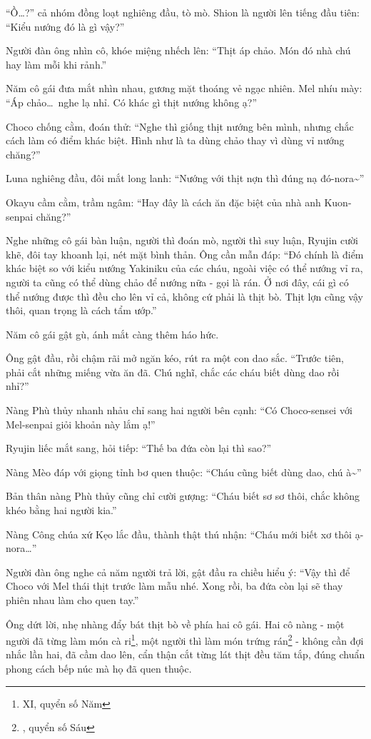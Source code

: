 \documentclass[../main.tex]{subfiles}
\begin{document}
``Ồ\dots?'' cả nhóm đồng loạt nghiêng đầu, tò mò. Shion là người lên tiếng đầu tiên: ``Kiểu nướng đó là gì vậy?''

Người đàn ông nhìn cô, khóe miệng nhếch lên: ``Thịt áp chảo. Món đó nhà chú hay làm mỗi khi rảnh.''

Năm cô gái đưa mắt nhìn nhau, gương mặt thoáng vẻ ngạc nhiên. Mel nhíu mày: ``Áp chảo\dots\ nghe lạ nhỉ. Có khác gì thịt nướng không ạ?''

Choco chống cằm, đoán thử: ``Nghe thì giống thịt nướng bên mình, nhưng chắc cách làm có điểm khác biệt. Hình như là ta dùng chảo thay vì dùng vỉ nướng chăng?''

Luna nghiêng đầu, đôi mắt long lanh: ``Nướng với thịt nợn thì đúng nạ đó-nora\~{}''

Okayu cầm cằm, trầm ngâm: ``Hay đây là cách ăn đặc biệt của nhà anh Kuon-senpai chăng?''

Nghe những cô gái bàn luận, người thì đoán mò, người thì suy luận, Ryujin cười khẽ, đôi tay khoanh lại, nét mặt bình thản. Ông cần mẫn đáp: ``Đó chính là điểm khác biệt so với kiểu nướng Yakiniku của các cháu, ngoài việc có thể nướng vỉ ra, người ta cũng có thể dùng chảo để nướng nữa - gọi là rán. Ở nơi đây, cái gì có thể nướng được thì đều cho lên vỉ cả, không cứ phải là thịt bò. Thịt lợn cũng vậy thôi, quan trọng là cách tẩm ướp.''

Năm cô gái gật gù, ánh mắt càng thêm háo hức.

Ông gật đầu, rồi chậm rãi mở ngăn kéo, rút ra một con dao sắc. ``Trước tiên, phải cắt những miếng vừa ăn đã. Chú nghĩ, chắc các cháu biết dùng dao rồi nhỉ?''

Nàng Phù thủy nhanh nhảu chỉ sang hai người bên cạnh: ``Có Choco-sensei với Mel-senpai giỏi khoản này lắm ạ!''

Ryujin liếc mắt sang, hỏi tiếp: ``Thế ba đứa còn lại thì sao?''

Nàng Mèo đáp với giọng tỉnh bơ quen thuộc: ``Cháu cũng biết dùng dao, chú à\~{}''

Bản thân nàng Phù thủy cũng chỉ cười gượng: ``Cháu biết sơ sơ thôi, chắc không khéo bằng hai người kia.''

Nàng Công chúa xứ Kẹo lắc đầu, thành thật thú nhận: ``Cháu mới biết xơ thôi ạ-nora\dots''

Người đàn ông nghe cả năm người trả lời, gật đầu ra chiều hiểu ý: ``Vậy thì để Choco với Mel thái thịt trước làm mẫu nhé. Xong rồi, ba đứa còn lại sẽ thay phiên nhau làm cho quen tay.''

Ông dứt lời, nhẹ nhàng đẩy bát thịt bò về phía hai cô gái. Hai cô nàng - một người đã từng làm món cà ri\footnote{ {\ab XI}, quyển số Năm}, một người thì làm món trứng rán\footnote{, quyển số Sáu} - không cần đợi nhắc lần hai, đã cầm dao lên, cẩn thận cắt từng lát thịt đều tăm tắp, đúng chuẩn phong cách bếp núc mà họ đã quen thuộc.
\end{document}
